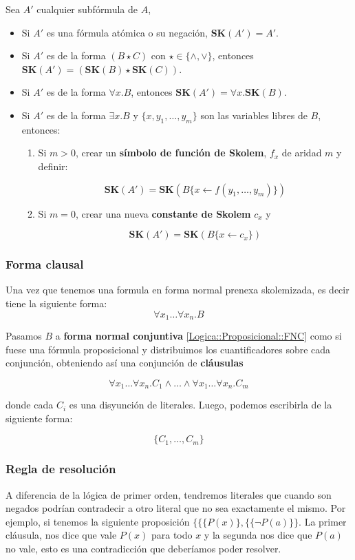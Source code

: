 Sea $A'$ cualquier subfórmula de $A$, 
\begin{itemize}
\item Si $A'$ es una fórmula atómica o su negación, \textbf{SK}$(A') = A'$.
\item Si $A'$ es de la forma $(B\star C)$ con $\star \in \{\land,\lor\}$, entonces $\textbf{SK}(A') = (\textbf{SK}(B)\star \textbf{SK}(C))$.
\item Si $A'$ es de la forma $\forall x.B$, entonces $\textbf{SK}(A') = \forall x.\textbf{SK}(B)$.
\item Si $A'$ es de la forma $\exists x.B$ y $\{x,y_1,\dots,y_m\}$ son las variables libres de $B$, entonces:
\begin{enumerate}
\item Si $m>0$, crear un \textbf{símbolo de función de Skolem}, $f_x$ de aridad $m$ y definir:

$$\textbf{SK}(A') = \textbf{SK}(B\{ x \leftarrow f(y_1,\dots,y_m)\})$$

\item Si $m=0$, crear una nueva \textbf{constante de Skolem} $c_x$ y

$$\textbf{SK}(A') = \textbf{SK}(B\{ x \leftarrow c_x\})$$

\end{enumerate}
\end{itemize}

\subsubsection*{Forma clausal}
Una vez que tenemos una formula en forma normal prenexa skolemizada, es decir tiene la siguiente forma:
 $$\forall x_1\dots\forall x_n.B$$

Pasamos $B$ a \textbf{forma normal conjuntiva} \ref{Logica::Proposicional::FNC} como si fuese una fórmula proposicional y distribuimos los cuantificadores sobre cada conjunción, obteniendo así una conjunción de \textbf{cláusulas}

$$\forall x_1\dots\forall x_n.C_1\land\dots\land\forall x_1\dots\forall x_n.C_m$$

donde cada $C_i$ es una disyunción de literales.  Luego, podemos escribirla de la siguiente forma:

$$ \{C_1,\dots,C_m\}$$

\subsubsection{Regla de resolución}
A diferencia de la lógica de primer orden, tendremos literales que cuando son negados podrían contradecir a otro literal que no sea exactamente el mismo. Por ejemplo, si tenemos la siguiente proposición $\{\{\{P(x)\},\{\{\lnot P(a)\}\}$. La primer cláusula, nos dice que vale $P(x)$ para todo $x$ y la segunda nos dice que $P(a)$ no vale, esto es una contradicción que deberíamos poder resolver. 

